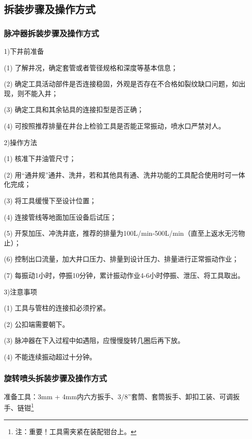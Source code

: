 \subsection{拆装步骤及操作方式}
\subsubsection{脉冲器拆装步骤及操作方式}
1)下井前准备

(1) 了解井况，确定套管或者管径规格和深度等基本信息；

(2) 确定工具活动部件是否连接稳固，外观是否存在不合格如裂纹缺口问题，如出现，则不能入井；

(3) 确定工具和其余钻具的连接扣型是否正确；

(4) 可按照推荐排量在井台上检验工具是否能正常振动，喷水口严禁对人。

2)操作方法

(1) 核准下井油管尺寸；

(2) 用“通井规”通井、洗井，若和其他具有通、洗井功能的工具配合使用时可一体化完成；

(3) 将工具缓慢下至设计位置；

(4) 连接管线等地面加压设备后试压；

(5) 开泵加压、冲洗井底，推荐的排量为100L/min-500L/min（直至上返水无污物止）；

(6) 控制出口流量，加大井口压力、排量到设计压力、排量进行正常振动作业；

(7) 每振动1小时，停振10分钟，累计振动作业4-6小时停振、泄压、将工具取出。

3)注意事项

(1) 工具与管柱的连接扣必须拧紧。

(2) 公扣端需要朝下。

(3) 脉冲器在下入过程中如遇阻，应慢慢旋转几圈后再下放。

(4) 不能连续振动超过十分钟。

\subsubsection{旋转喷头拆装步骤及操作方式}


准备工具：3mm + 4mm内六方扳手、3/8''套筒、套筒扳手、卸扣工装、可调扳手、链钳\footnote{注：重要！工具需夹紧在装配钳台上。}

